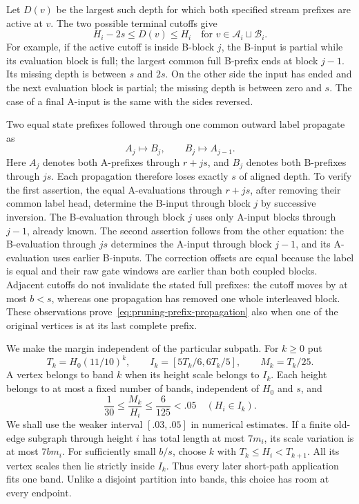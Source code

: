 Let $D(v)$ be the largest such depth for which both specified stream
prefixes are active at $v$.  The two possible terminal cutoffs give
\begin{equation}
\label{eq:pruning-available-depth}
 H_i-2s\leq D(v)\leq H_i
 \quad\text{for }v\in\mathscr A_i\sqcup\mathscr B_i.
\end{equation}
For example, if the active cutoff is inside B-block $j$, the B-input is
partial while its evaluation block is full; the largest common full
B-prefix ends at block $j-1$.  Its missing depth is between $s$ and $2s$.
On the other side the input has ended and the next evaluation block is
partial; the missing depth is between zero and $s$.  The case of a final
A-input is the same with the sides reversed.

Two equal state prefixes followed through one common outward label
propagate as
\begin{equation}
\label{eq:pruning-prefix-propagation}
  A_j\longmapsto B_j,\qquad B_j\longmapsto A_{j-1}.
\end{equation}
Here $A_j$ denotes both A-prefixes through $r+js$, and $B_j$ denotes both
B-prefixes through $js$.  Each propagation therefore loses exactly $s$
of aligned depth.  To verify the first assertion, the equal A-evaluations
through $r+js$, after removing their common label head, determine the B-input
through block $j$ by successive inversion.  The B-evaluation through block
$j$ uses only A-input blocks through $j-1$, already known.  The second
assertion follows from the other equation: the B-evaluation through $js$
determines the A-input through block $j-1$, and its A-evaluation uses earlier
B-inputs.  The correction offsets are equal because the label is equal and
their raw gate windows are earlier than both coupled blocks.  Adjacent
cutoffs do not invalidate the stated full prefixes: the cutoff moves by at
most $b<s$, whereas one propagation has removed one whole interleaved
block.  These observations prove~\eqref{eq:pruning-prefix-propagation}
also when one of the original vertices is at its last complete prefix.

We make the margin independent of the particular subpath.  For $k\geq0$
put
\[
 T_k=H_0(11/10)^k,\qquad
 I_k=[5T_k/6,6T_k/5],\qquad M_k=T_k/25.
\]
A vertex belongs to band $k$ when its height scale belongs to $I_k$.
Each height belongs to at most a fixed number of bands, independent of
$H_0$ and $s$, and
\begin{equation}
\label{eq:pruning-margin-range}
 \frac1{30}\leq\frac{M_k}{H_i}\leq\frac{6}{125}<.05
 \quad(H_i\in I_k).
\end{equation}
We shall use the weaker interval $[.03,.05]$ in numerical estimates.
If a finite old-edge subgraph through height $i$ has total length at most
$7m_i$, its scale variation is at most $7bm_i$.  For sufficiently small
$b/s$, choose $k$ with $T_k\leq H_i<T_{k+1}$.  All its vertex scales then
lie strictly inside $I_k$.  Thus every later short-path application fits
one band.  Unlike a disjoint partition into bands, this choice has room
at every endpoint.

